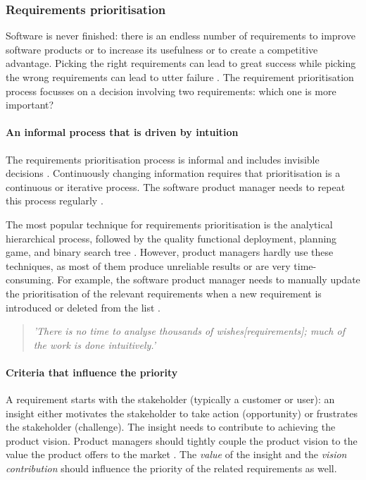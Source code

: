 \subsubsection{Requirements prioritisation} \label{tf-val-rp}
Software is never finished: there is an endless number of requirements to improve software products or to increase its usefulness or to create a competitive advantage. Picking the right requirements can lead to great success while picking the wrong requirements can lead to utter failure \parencite{PM17}. The requirement prioritisation process focusses on a decision involving two requirements: which one is more important? 

\paragraph{An informal process that is driven by intuition} 
The requirements prioritisation process is informal and includes invisible decisions \parencite{PM20}. Continuously changing information requires that prioritisation is a continuous or iterative process. The software product manager needs to repeat this process regularly \parencite{PM22}.

The most popular technique for requirements prioritisation is the analytical hierarchical process, followed by the quality functional deployment, planning game, and binary search tree \parencite{PM29}. However, product managers hardly use these techniques, as most of them produce unreliable results or are very time-consuming. For example, the software product manager needs to manually update the prioritisation of the relevant requirements when a new requirement is introduced or deleted from the list \parencite{PM29}. 

\begin{quote}\itshape
'There is no time to analyse thousands of wishes[requirements]; much of the work is done intuitively.' \parencite{PM20}
\end{quote}

\paragraph{Criteria that influence the priority} \label{rpp_solution} 
A requirement starts with the stakeholder (typically a customer or user): an insight either motivates the stakeholder to take action (opportunity) or frustrates the stakeholder (challenge). The insight needs to contribute to achieving the product vision. Product managers should tightly couple the product vision to the value the product offers to the market \parencite{PM16}. The \emph{value} of the insight and the \emph{vision contribution} should influence the priority of the related requirements as well.

